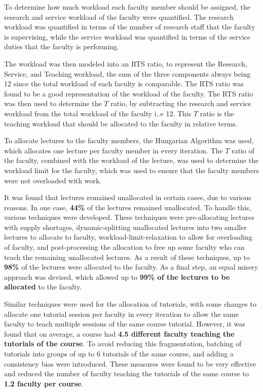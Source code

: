 To determine how much workload each faculty member should be assigned, the research and service workload of the faculty were quantified. The research workload was quantified in terms of the number of research staff that the faculty is supervising, while the service workload was quantified in terms of the service duties that the faculty is performing.

The workload was then modeled into an RTS ratio, to represent the Research, Service, and Teaching workload, the sum of the three components always being 12 since the total workload of each faculty is comparable. The RTS ratio was found to be a good representation of the workload of the faculty. The RTS ratio was then used to determine the $T$ ratio, by subtracting the research and service workload from the total workload of the faculty i..e 12. This $T$ ratio is the teaching workload that should be allocated to the faculty in relative terms.

To allocate lectures to the faculty members, the Hungarian Algorithm was used, which allocates one lecture per faculty member in every iteration. The $T$ ratio of the faculty, combined with the workload of the lecture, was used to determine the workload limit for the faculty, which was used to ensure that the faculty members were not overloaded with work.

It was found that lectures remained unallocated in certain cases, due to various reasons. In one case, \textbf{44\%} of the lectures remained unallocated. To handle this, various techniques were developed. These techniques were pre-allocating lectures with supply shortages, dynamic-splitting unallocated lectures into two smaller lectures to allocate to faculty, workload-limit-relaxation to allow for overloading of faculty, and post-processing the allocation to free up some faculty who can teach the remaining unallocated lectures. As a result of these techniques, up to \textbf{98\%} of the lectures were allocated to the faculty. As a final step, an equal misery approach was devised, which allowed up to \textbf{99\% of the lectures to be allocated} to the faculty.

Similar techniques were used for the allocation of tutorials, with some changes to allocate one tutorial session per faculty in every iteration to allow the same faculty to teach multiple sessions of the same course tutorial. However, it was found that on average, a course had \textbf{4.5 different faculty teaching the tutorials of the course}. To avoid reducing this fragmentation, batching of tutorials into groups of up to 6 tutorials of the same course, and adding a consistency bias were introduced. These measures were found to be very effective and reduced the number of faculty teaching the tutorials of the same course to \textbf{1.2 faculty per course}.

